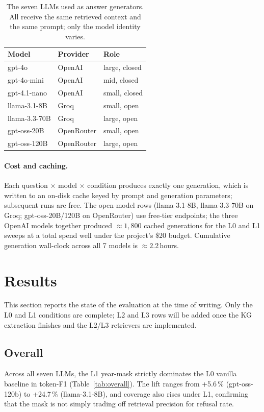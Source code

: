 \documentclass[11pt]{article}
\begin{document}
\begin{table}[h]
\centering
\small
\begin{tabular}{lll}
\toprule
Model & Provider & Role \\
\midrule
gpt-4o              & OpenAI     & large, closed \\
gpt-4o-mini         & OpenAI     & mid, closed   \\
gpt-4.1-nano        & OpenAI     & small, closed \\
llama-3.1-8B        & Groq       & small, open   \\
llama-3.3-70B       & Groq       & large, open   \\
gpt-oss-20B         & OpenRouter & small, open   \\
gpt-oss-120B        & OpenRouter & large, open   \\
\bottomrule
\end{tabular}
\caption{The seven LLMs used as answer generators. All receive the
same retrieved context and the same prompt; only the model identity
varies.}
\label{tab:models}
\end{table}

\paragraph{Cost and caching.}
Each question $\times$ model $\times$ condition produces exactly one
generation, which is written to an on-disk cache keyed by prompt and
generation parameters; subsequent runs are free. The open-model rows
(llama-3.1-8B, llama-3.3-70B on Groq; gpt-oss-20B/120B on OpenRouter)
use free-tier endpoints; the three OpenAI models together produced
$\approx1{,}800$ cached generations for the L0 and L1 sweeps at a
total spend well under the project's \$20 budget. Cumulative
generation wall-clock across all 7 models is $\approx 2.2$\,hours.

\section{Results}
\label{sec:results}

This section reports the state of the evaluation at the time of
writing. Only the L0 and L1 conditions are complete; L2 and L3 rows
will be added once the KG extraction finishes and the L2/L3
retrievers are implemented.

\subsection{Overall}
\label{sec:r-overall}
Across all seven LLMs, the L1 year-mask strictly dominates the L0
vanilla baseline in token-F1 (Table~\ref{tab:overall}). The lift
ranges from +5.6\,\% (gpt-oss-120b) to +24.7\,\% (llama-3.1-8B), and
coverage also rises under L1, confirming that the mask is not simply
trading off retrieval precision for refusal rate.
\end{document}
